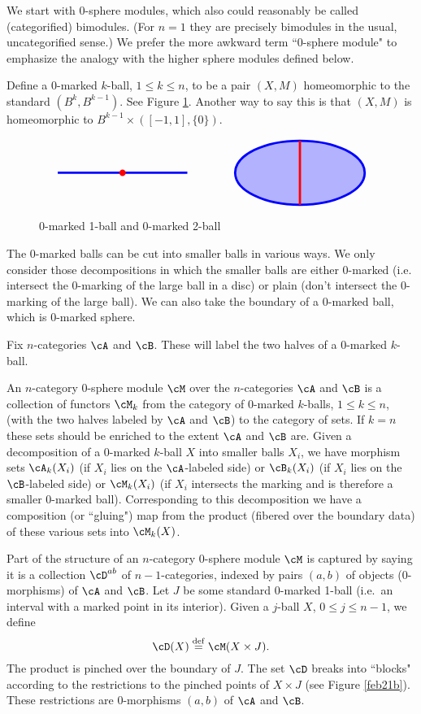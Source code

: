 We start with $0$-sphere modules, which also could reasonably be called (categorified) bimodules.
(For $n=1$ they are precisely bimodules in the usual, uncategorified sense.)
We prefer the more awkward term ``0-sphere module" to emphasize the analogy
with the higher sphere modules defined below.

Define a $0$-marked $k$-ball, $1\le k \le n$, to be a pair  $(X, M)$ homeomorphic to the standard
$(B^k, B^{k-1})$.
See Figure \ref{feb21a}.
Another way to say this is that $(X, M)$ is homeomorphic to $B^{k-1}\times([-1,1], \{0\})$.

\begin{figure}[t]
$$\tikz[baseline,line width=2pt]{\draw[blue] (-2,0)--(2,0); \fill[red] (0,0) circle (0.1);} \qquad \qquad \tikz[baseline,line width=2pt]{\draw[blue][fill=blue!30!white] (0,0) circle (2 and 1); \draw[red] (0,1)--(0,-1);}$$
\caption{0-marked 1-ball and 0-marked 2-ball}
\label{feb21a}
\end{figure}

The $0$-marked balls can be cut into smaller balls in various ways.
We only consider those decompositions in which the smaller balls are either
$0$-marked (i.e. intersect the $0$-marking of the large ball in a disc) 
or plain (don't intersect the $0$-marking of the large ball).
We can also take the boundary of a $0$-marked ball, which is $0$-marked sphere.

Fix $n$-categories $\cA$ and $\cB$.
These will label the two halves of a $0$-marked $k$-ball.

An $n$-category $0$-sphere module $\cM$ over the $n$-categories $\cA$ and $\cB$ is 
a collection of functors $\cM_k$ from the category
of $0$-marked $k$-balls, $1\le k \le n$,
(with the two halves labeled by $\cA$ and $\cB$) to the category of sets.
If $k=n$ these sets should be enriched to the extent $\cA$ and $\cB$ are.
Given a decomposition of a $0$-marked $k$-ball $X$ into smaller balls $X_i$, we have
morphism sets $\cA_k(X_i)$ (if $X_i$ lies on the $\cA$-labeled side)
or $\cB_k(X_i)$ (if $X_i$ lies on the $\cB$-labeled side)
or $\cM_k(X_i)$ (if $X_i$ intersects the marking and is therefore a smaller 0-marked ball).
Corresponding to this decomposition we have a composition (or ``gluing") map
from the product (fibered over the boundary data) of these various sets into $\cM_k(X)$.

\medskip

Part of the structure of an $n$-category 0-sphere module $\cM$  is captured by saying it is
a collection $\cD^{ab}$ of $n{-}1$-categories, indexed by pairs $(a, b)$ of objects (0-morphisms)
of $\cA$ and $\cB$.
Let $J$ be some standard 0-marked 1-ball (i.e.\ an interval with a marked point in its interior).
Given a $j$-ball $X$, $0\le j\le n-1$, we define
\[
	\cD(X) \deq \cM(X\times J) .
\]
The product is pinched over the boundary of $J$.
The set $\cD$ breaks into ``blocks" according to the restrictions to the pinched points of $X\times J$
(see Figure \ref{feb21b}).
These restrictions are 0-morphisms $(a, b)$ of $\cA$ and $\cB$.

